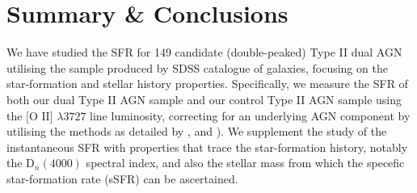 \section{Summary \& Conclusions}

We have studied the SFR for 149 candidate (double-peaked) Type II dual AGN utilising the sample produced by \cite{Liu_2009} SDSS catalogue of galaxies, focusing on the star-formation and stellar history properties. Specifically, we measure the SFR of both our dual Type II AGN sample and our control Type II AGN sample using the $\text{[O II]}$ $\lambda3727$ line luminosity, correcting for an underlying AGN component by utilising the methods as detailed by \cite{Ho_2005}, \cite{Kim_2006} and \cite{Silverman_2009}). We supplement the study of the instantaneous SFR with properties that trace the star-formation history, notably the $\text{D}_{n}(4000)$ spectral index, and also the stellar mass from which the specefic star-formation rate (sSFR) can be ascertained.    
  
  
  
  
